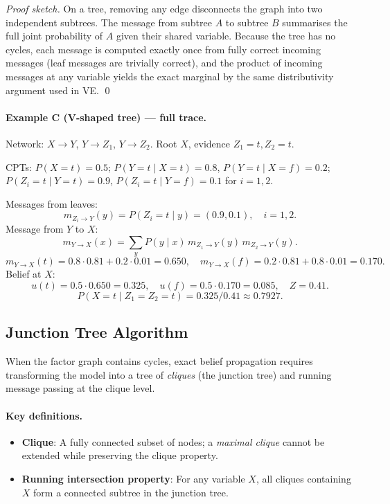 \begin{proof}[Proof sketch]
On a tree, removing any edge disconnects the graph into two independent
subtrees. The message from subtree $A$ to subtree $B$ summarises the full
joint probability of $A$ given their shared variable. Because the tree has
no cycles, each message is computed exactly once from fully correct incoming
messages (leaf messages are trivially correct), and the product of incoming
messages at any variable yields the exact marginal by the same distributivity
argument used in VE. \qed
\end{proof}

\paragraph{Example C (V-shaped tree) --- full trace.}
Network: $X\to Y$, $Y\to Z_1$, $Y\to Z_2$. Root $X$, evidence $Z_1=t,Z_2=t$.

CPTs: $P(X=t)=0.5$; $P(Y=t\mid X=t)=0.8$, $P(Y=t\mid X=f)=0.2$;
$P(Z_i=t\mid Y=t)=0.9$, $P(Z_i=t\mid Y=f)=0.1$ for $i=1,2$.

Messages from leaves:
\[
m_{Z_i\to Y}(y)=P(Z_i=t\mid y)=(0.9,0.1),\quad i=1,2.
\]
Message from $Y$ to $X$:
\[
m_{Y\to X}(x)=\sum_y P(y\mid x)\,m_{Z_1\to Y}(y)\,m_{Z_2\to Y}(y).
\]
\[
m_{Y\to X}(t)=0.8{\cdot}0.81+0.2{\cdot}0.01=0.650,\quad
m_{Y\to X}(f)=0.2{\cdot}0.81+0.8{\cdot}0.01=0.170.
\]
Belief at $X$:
\[
u(t)=0.5{\cdot}0.650=0.325,\quad u(f)=0.5{\cdot}0.170=0.085,
\quad Z=0.41.
\]
\[
P(X=t\mid Z_1=Z_2=t)=0.325/0.41\approx\mathbf{0.7927}.
\]

\subsection{Junction Tree Algorithm}

When the factor graph contains cycles, exact belief propagation requires
transforming the model into a tree of \emph{cliques} (the junction tree) and
running message passing at the clique level.

\paragraph{Key definitions.}
\begin{itemize}
\item \textbf{Clique}: A fully connected subset of nodes; a
      \emph{maximal clique} cannot be extended while preserving the clique
      property.
\item \textbf{Running intersection property}: For any variable $X$, all
      cliques containing $X$ form a connected subtree in the junction tree.
\end{itemize}

